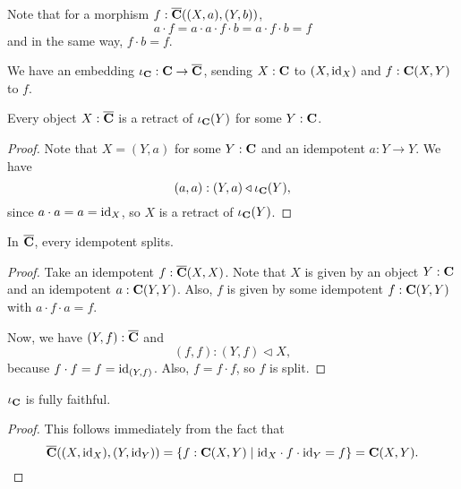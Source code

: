 \begin{remark}
  Note that for a morphism $ f: \overline {\mathbf{C}}((X, a), (Y, b)) $,
  \[ a \cdot f = a \cdot a \cdot f \cdot b = a \cdot f \cdot b = f \]
  and in the same way, $ f \cdot b = f $.
\end{remark}

\begin{definition}
  We have an embedding $ \iota_{\mathbf{C}}: \mathbf{C} \to \overline {\mathbf{C}} $, sending $ X: \mathbf{C} $ to $ (X, \text{id}_{X}) $ and $ f: \mathbf{C}(X, Y) $ to $ f $.
\end{definition}

\begin{lemma}\label{lem:karoubi-is-retract}
  Every object $ X: \overline {\mathbf{C}} $ is a retract of $ \iota_{\mathbf{C}}(Y) $ for some $ Y: \mathbf{C} $.
\end{lemma}
\begin{proof}
  Note that $ X = (Y, a) $ for some $ Y: \mathbf{C} $ and an idempotent $ a: Y \to Y $. We have
  \[ (a, a) : (Y, a) \triangleleft \iota_{\mathbf{C}}(Y), \]
  since $ a \cdot a = a = \text{id}_{X} $, so $ X $ is a retract of $ \iota_{\mathbf{C}}(Y) $.
\end{proof}

\begin{lemma}
  In $ \overline {\mathbf{C}} $, every idempotent splits.
\end{lemma}
\begin{proof}
  Take an idempotent $ f: \overline {\mathbf{C}}(X, X) $. Note that $ X $ is given by an object $ Y: \mathbf{C} $ and an idempotent $ a: \mathbf{C}(Y, Y) $. Also, $ f $ is given by some idempotent $ f: \mathbf{C}(Y, Y) $ with $ a \cdot f \cdot a = f $.

  Now, we have $ (Y, f): \overline {\mathbf{C}} $ and
  \[ (f, f) : (Y, f) \triangleleft X, \]
  because $ f \cdot f = f = \text{id}_{(Y, f)} $. Also, $ f = f \cdot f $, so $ f $ is split.
\end{proof}

\begin{lemma}
  $ \iota_{\mathbf{C}} $ is fully faithful.
\end{lemma}
\begin{proof}
  This follows immediately from the fact that
  \[ \overline {\mathbf{C}}((X, \text{id}_{X}), (Y, \text{id}_{Y})) = \{ f: \mathbf{C}(X, Y) \mid \text{id}_{X} \cdot f \cdot \text{id}_{Y} = f \} = \mathbf{C}(X, Y). \]
\end{proof}

